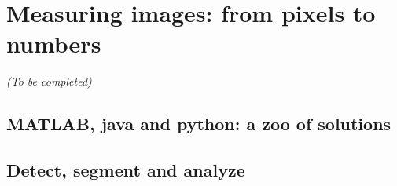 \section{Measuring images: from pixels to numbers}
\label{sec:computation_biology}

\begin{center}
	\textit{(To be completed)}
\end{center}

\subsection{MATLAB, java and python: a zoo of solutions}
\label{subsec:intro_tools}

\subsection{Detect, segment and analyze}
\label{subsec:intro_pipeline}





